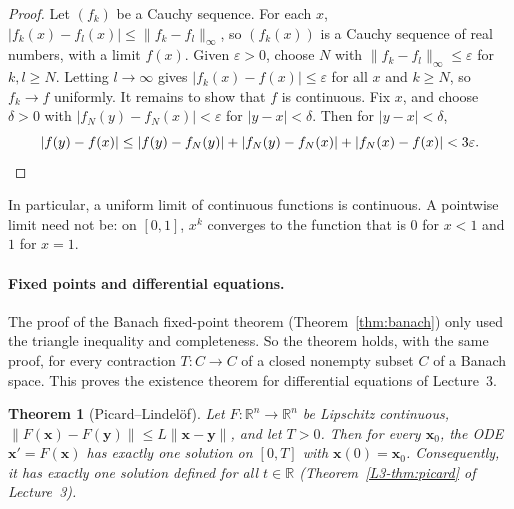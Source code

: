 \documentclass[11pt]{article}
\newcommand{\norm}[1]{\lVert #1 \rVert}
\theoremstyle{definition}
\theoremstyle{plain}
\newtheorem{theorem}[definition]{Theorem}
\theoremstyle{remark}
\begin{document}
\begin{proof}
    Let $(f_k)$ be a Cauchy sequence. For each $x$, $|f_k(x) - f_l(x)| \leq \norm{f_k - f_l}_\infty$, so $(f_k(x))$ is a Cauchy sequence of real numbers, with a limit $f(x)$. Given $\varepsilon > 0$, choose $N$ with $\norm{f_k - f_l}_\infty \leq \varepsilon$ for $k, l \geq N$. Letting $l \to \infty$ gives $|f_k(x) - f(x)| \leq \varepsilon$ for all $x$ and $k \geq N$, so $f_k \to f$ uniformly. It remains to show that $f$ is continuous. Fix $x$, and choose $\delta > 0$ with $|f_N(y) - f_N(x)| < \varepsilon$ for $|y - x| < \delta$. Then for $|y - x| < \delta$,
    \[|f(y) - f(x)| \leq |f(y) - f_N(y)| + |f_N(y) - f_N(x)| + |f_N(x) - f(x)| < 3\varepsilon. \qedhere\]
\end{proof}

In particular, a uniform limit of continuous functions is continuous. A pointwise limit need not be: on $[0, 1]$, $x^k$ converges to the function that is $0$ for $x < 1$ and $1$ for $x = 1$.

\paragraph{Fixed points and differential equations.} The proof of the Banach fixed-point theorem (Theorem~\ref{thm:banach}) only used the triangle inequality and completeness. So the theorem holds, with the same proof, for every contraction $T: C \to C$ of a closed nonempty subset $C$ of a Banach space. This proves the existence theorem for differential equations of Lecture~3.

\begin{theorem}[Picard--Lindel\"of]\label{thm:picard-lindelof}
    Let $F: \mathbb{R}^n \to \mathbb{R}^n$ be Lipschitz continuous, $\norm{F(\mathbf{x}) - F(\mathbf{y})} \leq L\norm{\mathbf{x} - \mathbf{y}}$, and let $T > 0$. Then for every $\mathbf{x}_0$, the ODE $\mathbf{x}' = F(\mathbf{x})$ has exactly one solution on $[0, T]$ with $\mathbf{x}(0) = \mathbf{x}_0$. Consequently, it has exactly one solution defined for all $t \in \mathbb{R}$ (Theorem~\ref{L3-thm:picard} of Lecture~3).
\end{theorem}
\end{document}
